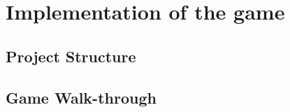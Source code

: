 \chapter{Implementation of the game}\label{ch:implementation}
\section{Project Structure}
\section{Game Walk-through}
